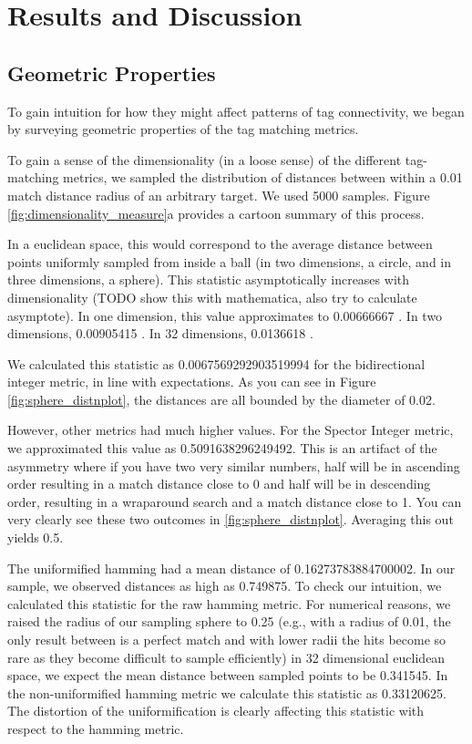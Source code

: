 \section{Results and Discussion}

\subsection{Geometric Properties}

To gain intuition for how they might affect patterns of tag connectivity, we began by surveying geometric properties of the tag matching metrics.





To gain a sense of the dimensionality (in a loose sense) of the different tag-matching metrics, we sampled the distribution of distances between within a 0.01 match distance radius of an arbitrary target.
We used 5000 samples.
Figure \ref{fig:dimensionality_measure}a provides a cartoon summary of this process.

In a euclidean space, this would correspond to the average distance between points uniformly sampled from inside a ball (in two dimensions, a circle, and in three dimensions, a sphere).
This statistic asymptotically increases with dimensionality (TODO show this with mathematica, also try to calculate asymptote).
In one dimension, this value approximates to 0.00666667 \citep{dunbar1997average}.
In two dimensions, 0.00905415 \citep{dunbar1997average}.
In 32 dimensions, 0.0136618 \citep{dunbar1997average}.

We calculated this statistic as  0.0067569292903519994 for the bidirectional integer metric, in line with expectations.
As you can see in Figure \ref{fig:sphere_distnplot}, the distances are all bounded by the diameter of 0.02.

However, other metrics had much higher values.
For the Spector Integer metric, we approximated this value as 0.5091638296249492.
This is an artifact of the asymmetry where if you have two very similar numbers, half will be in ascending order resulting in a match distance close to 0 and half will be in descending order, resulting in a wraparound search and a match distance close to 1.
You can very clearly see these two outcomes in \ref{fig:sphere_distnplot}.
Averaging this out yields 0.5.

The uniformified hamming had a mean distance of 0.16273783884700002.
In our sample, we observed distances as high as 0.749875.
To check our intuition, we calculated this statistic for the raw hamming metric.
For numerical reasons, we raised the radius of our sampling sphere to 0.25 (e.g., with a radius of 0.01, the only result between is a perfect match and with lower radii the hits become so rare as they become difficult to sample efficiently)
in 32 dimensional euclidean space, we expect the mean distance between sampled points to be 0.341545.
In the non-uniformified hamming metric we calculate this statistic as 0.33120625.
The distortion of the uniformification is clearly affecting this statistic with respect to the hamming metric.

